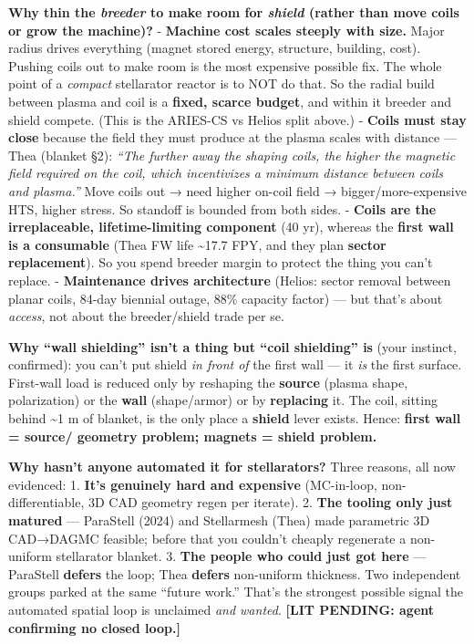 \documentclass[
]{article}
\begin{document}
\textbf{Why thin the \emph{breeder} to make room for \emph{shield}
(rather than move coils or grow the machine)?} - \textbf{Machine cost
scales steeply with size.} Major radius drives everything (magnet stored
energy, structure, building, cost). Pushing coils out to make room is
the most expensive possible fix. The whole point of a \emph{compact}
stellarator reactor is to NOT do that. So the radial build between
plasma and coil is a \textbf{fixed, scarce budget}, and within it
breeder and shield compete. (This is the ARIES-CS vs Helios split
above.) - \textbf{Coils must stay close} because the field they must
produce at the plasma scales with distance --- Thea (blanket §2):
\emph{``The further away the shaping coils, the higher the magnetic
field required on the coil, which incentivizes a minimum distance
between coils and plasma.''} Move coils out → need higher on-coil field
→ bigger/more-expensive HTS, higher stress. So standoff is bounded from
both sides. - \textbf{Coils are the irreplaceable, lifetime-limiting
component} (40 yr), whereas the \textbf{first wall is a consumable}
(Thea FW life \textasciitilde17.7 FPY, and they plan \textbf{sector
replacement}). So you spend breeder margin to protect the thing you
can't replace. - \textbf{Maintenance drives architecture} (Helios:
sector removal between planar coils, 84-day biennial outage, 88\%
capacity factor) --- but that's about \emph{access}, not about the
breeder/shield trade per se.

\textbf{Why ``wall shielding'' isn't a thing but ``coil shielding'' is}
(your instinct, confirmed): you can't put shield \emph{in front of} the
first wall --- it \emph{is} the first surface. First-wall load is
reduced only by reshaping the \textbf{source} (plasma shape,
polarization) or the \textbf{wall} (shape/armor) or by
\textbf{replacing} it. The coil, sitting behind \textasciitilde1 m of
blanket, is the only place a \textbf{shield} lever exists. Hence:
\textbf{first wall = source/ geometry problem; magnets = shield
problem.}

\textbf{Why hasn't anyone automated it for stellarators?} Three reasons,
all now evidenced: 1. \textbf{It's genuinely hard and expensive}
(MC-in-loop, non-differentiable, 3D CAD geometry regen per iterate). 2.
\textbf{The tooling only just matured} --- ParaStell (2024) and
Stellarmesh (Thea) made parametric 3D CAD→DAGMC feasible; before that
you couldn't cheaply regenerate a non-uniform stellarator blanket. 3.
\textbf{The people who could just got here} --- ParaStell
\textbf{defers} the loop; Thea \textbf{defers} non-uniform thickness.
Two independent groups parked at the same ``future work.'' That's the
strongest possible signal the automated spatial loop is unclaimed
\emph{and wanted}. \textbf{{[}LIT PENDING: agent confirming no closed
loop.{]}}
\end{document}
